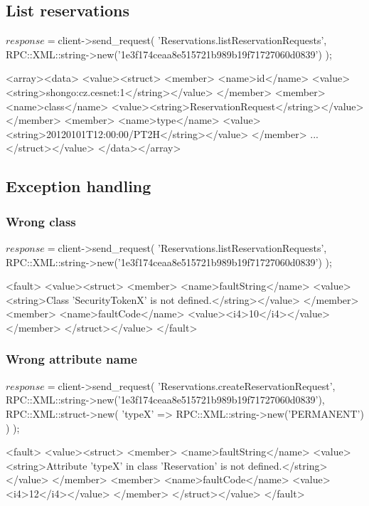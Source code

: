 \subsection{List reservations}
\begin{PerlCmd}
$response = $client->send_request(
    'Reservations.listReservationRequests',
    RPC::XML::string->new('1e3f174ceaa8e515721b989b19f71727060d0839')
);
\end{PerlCmd}
\begin{PerlResponse}
<array><data>
  <value><struct>
    <member>
      <name>id</name>
      <value><string>shongo:cz.cesnet:1</string></value>
    </member>
    <member>
      <name>class</name>
      <value><string>ReservationRequest</string></value>
    </member>
    <member>
      <name>type</name>
      <value><string>20120101T12:00:00/PT2H</string></value>    
    </member>
    ...
  </struct></value>
</data></array>
\end{PerlResponse}

\newpage
\subsection{Exception handling}
\subsubsection{Wrong class}
\begin{PerlCmd}
$response = $client->send_request(
    'Reservations.listReservationRequests',
    RPC::XML::string->new('1e3f174ceaa8e515721b989b19f71727060d0839')
);
\end{PerlCmd}
\begin{PerlResponse}
<fault>
  <value><struct>
    <member>
      <name>faultString</name>
      <value><string>Class 'SecurityTokenX' is not defined.</string></value>
    </member>
    <member>
      <name>faultCode</name>
      <value><i4>10</i4></value>
    </member>
  </struct></value>
</fault>
\end{PerlResponse}

\subsubsection{Wrong attribute name}
\begin{PerlCmd}
$response = $client->send_request(
    'Reservations.createReservationRequest',
    RPC::XML::string->new('1e3f174ceaa8e515721b989b19f71727060d0839'),
    RPC::XML::struct->new(
        'typeX' => RPC::XML::string->new('PERMANENT')
    )
);
\end{PerlCmd}
\begin{PerlResponse}
<fault>
  <value><struct>
    <member>
      <name>faultString</name>
      <value><string>Attribute 'typeX' in class 'Reservation' is not defined.</string></value>
    </member>
    <member>
      <name>faultCode</name>
      <value><i4>12</i4></value>
    </member>
  </struct></value>
</fault>
\end{PerlResponse}


